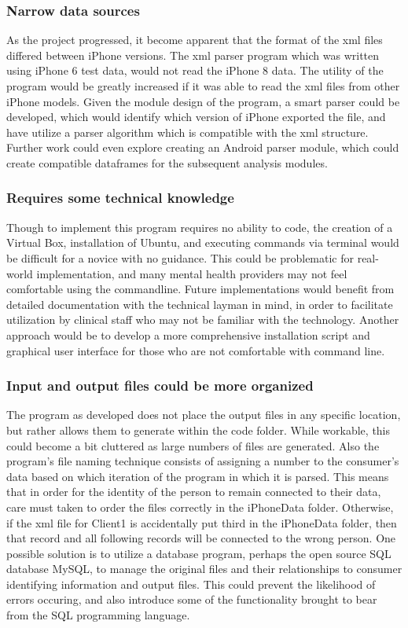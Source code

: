 \documentclass[sigconf]{acmart}
\begin{document}
\subsubsection{Narrow data sources}

As the project progressed, it become apparent that the format of the xml files differed between iPhone versions. The xml parser program which was written using iPhone 6 test data, would not read the iPhone 8 data. The utility of the program would be greatly increased if it was able to read the xml files from other iPhone models. Given the module design of the program, a smart parser could be developed, which would identify which version of iPhone exported the file, and have utilize a parser algorithm which is compatible with the xml structure. Further work could even explore creating an Android parser module, which could create compatible dataframes for the subsequent analysis modules.

\subsubsection{Requires some technical knowledge}

Though to implement this program requires no ability to code, the creation of a Virtual Box, installation of Ubuntu, and executing commands via terminal would be difficult for a novice with no guidance. This could be problematic for real-world implementation, and many mental health providers may not feel comfortable using the commandline. Future implementations would benefit from detailed documentation with the technical layman in mind, in order to facilitate utilization by clinical staff who may not be familiar with the technology. Another approach would be to develop a more comprehensive installation script and graphical user interface for those who are not comfortable with command line.

\subsubsection{Input and output files could be more organized}

The program as developed does not place the output files in any specific location, but rather allows them to generate within the code folder. While workable, this could become a bit cluttered as large numbers of files are generated. Also the program's file naming technique consists of assigning a number to the consumer's data based on which iteration of the program in which it is parsed. This means that in order for the identity of the person to remain connected to their data, care must taken to order the files correctly in the iPhoneData folder. Otherwise, if the xml file for Client1 is accidentally put third in the iPhoneData folder, then that record and all following records will be connected to the wrong person. One possible solution is to utilize a database program, perhaps the open source SQL database MySQL, to manage the original files and their relationships to consumer identifying information and output files. This could prevent the likelihood of errors occuring, and also introduce some of the functionality brought to bear from the SQL programming language.
\end{document}
